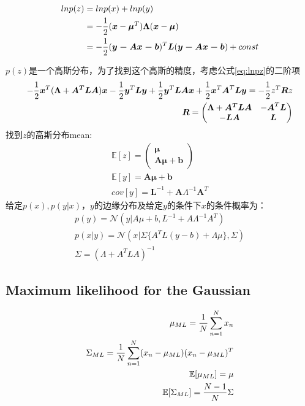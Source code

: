 \documentclass[a4paper]{article}
\begin{document}
\begin{align*}\label{eq:lnpz}
  ln p(z) &= ln p(x) + ln p(y) \\
  &= -{1 \over 2}(\boldsymbol{x}-\boldsymbol{\mu}^T)\boldsymbol{\Lambda}(\boldsymbol{x}-\boldsymbol{\mu})\\
  &= -{1 \over 2}(\boldsymbol{y-Ax-b})^T\boldsymbol{L}(\boldsymbol{y-Ax-b}) + const
\end{align*}

$p(z)$是一个高斯分布，为了找到这个高斯的精度，考虑公式\ref{eq:lnpz}的二阶项
\begin{align*}
-{1 \over 2}\boldsymbol{x}^T(\boldsymbol{\Lambda}+\boldsymbol{A^TLA})\boldsymbol{x} - {1 \over 2}\boldsymbol{y}^T\boldsymbol{Ly} + {1 \over 2}\boldsymbol{y}^T\boldsymbol{LAx} + {1 \over 2}\boldsymbol{x}^T\boldsymbol{A}^T\boldsymbol{Ly} = -{1 \over 2} z^T\boldsymbol{R}z\\
\boldsymbol{R} =
  \begin{pmatrix}
    \boldsymbol{\Lambda}+\boldsymbol{A^TLA} & - \boldsymbol{A}^T\boldsymbol{L}\\
   -\boldsymbol{LA} & \boldsymbol{L}
  \end{pmatrix}
\end{align*}
找到$z$的高斯分布mean:
\begin{align}
  \mathbb{E}[z] =  \begin{pmatrix}
    \boldsymbol{\mu}\\ \boldsymbol{A\mu}+\boldsymbol{b} \end{pmatrix}\\
  \mathbb{E}[y] = \boldsymbol{A\mu}+\boldsymbol{b}\\
  cov[y] = \boldsymbol{L}^{-1}+\boldsymbol{A}\Lambda^{-1}\boldsymbol{A}^T
\end{align}
给定$p(x), p(y|x)$，$y$的边缘分布及给定$y$的条件下$x$的条件概率为：
\begin{align}
  p(y) = \mathcal{N}(y|A\mu+b,L^{-1}+A\Lambda^{-1}A^T)\\
  p(x|y) = \mathcal{N}(x|\Sigma\{ A^TL(y-b)+\Lambda\mu \}, \Sigma)\\
  \Sigma = (\Lambda+A^TLA)^{-1}
\end{align}

\subsection{Maximum likelihood for the Gaussian}
\begin{align}
  \mu_{ML} = {1 \over N} \sum_{n=1}^N x_n\\
  \Sigma_{ML} = {1 \over N} \sum_{n=1}^N (x_n-\mu_{ML})(x_n-\mu_{ML})^T\\
  \mathbb{E}[\mu_{ML}] = \mu\\
  \mathbb{E}[\Sigma_{ML}] = {N-1 \over N} \Sigma
\end{align}
\end{document}
